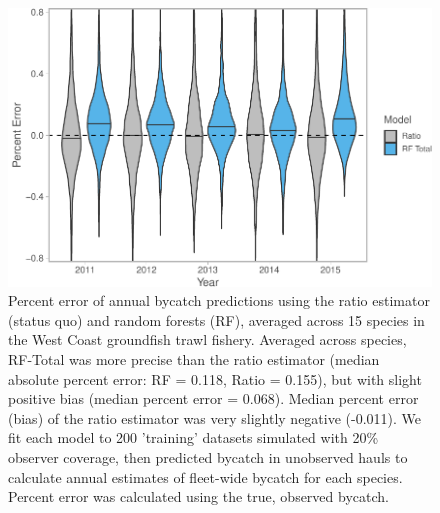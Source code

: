 \documentclass[]{article}
\begin{document}
\begin{figure}

{\centering \includegraphics[width=6in]{bycatch_sim_paper_sepsupp_appliedecology_files/figure-latex/model-comparison-byyear-1} 

}

\caption{Percent error of annual bycatch predictions using the ratio estimator (status quo) and random forests (RF), averaged across 15 species in the West Coast groundfish trawl fishery. Averaged across species, RF-Total was more precise than the ratio estimator (median absolute percent error: RF = 0.118, Ratio = 0.155), but with slight positive bias (median percent error = 0.068). Median percent error (bias) of the ratio estimator was very slightly negative (-0.011). We fit each model to 200 'training' datasets simulated with 20\% observer coverage, then predicted bycatch in unobserved hauls to calculate annual estimates of fleet-wide bycatch for each species. Percent error was calculated using the true, observed bycatch.}\label{fig:model-comparison-byyear}
\end{figure}

\pagebreak
\end{document}
